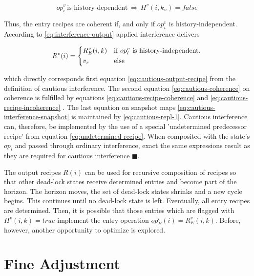 \documentclass[12pt,a4paper]{scrartcl}
\begin{document}
\begin{equation} \label{eq:cautious-recipe-incoherence}
    op^v_i \,\mbox{is history-dependent}\,\Rightarrow\,H^v(i, k_u) = false
\end{equation}

Thus, the entry recipes are coherent if, and only if $op^v_i$ is history-independent.
According to \eqref{eq:interference-output} applied interference delivers

\begin{equation} \label{eq:interference-output-2}
    R^v(i) = \begin{dcases*}
              R_E^v(i,k) & if $op^v_i$ is history-independent.\\
              v_r       & else
             \end{dcases*}
\end{equation}

which directly corresponds first equation \eqref{eq:cautious-output-recipe}
from the definition of cautious interference. The second equation
\eqref{eq:cautious-coherence} on coherence is fulfilled by equations
\eqref{eq:cautious-recipe-coherence} and
\eqref{eq:cautious-recipe-incoherence} . The last equation on snapshot maps
\eqref{eq:cautious-interference-snapshot} is maintained by
\eqref{eq:cautious-repl-1}.  Cautious interference can, therefore, be
implemented by the use of a special 'undetermined predecessor recipe' from
equation \eqref{eq:undetermined-recipe}.  When composited with the state's
$op_i$ and passed through ordinary interference, exact the same expressions
result as they are required for cautious interference $\blacksquare$.

The output recipes $R(i)$ can be used for recursive composition of recipes so
that other dead-lock states receive determined entries and become part of the
horizon.  The horizon moves, the set of dead-lock states shrinks and a new
cycle begins.  This continues until no dead-lock state is left.  Eventually,
all entry recipes are determined. Then, it is possible that those entries which
are flagged with $H^v(i,k)=true$ implement the entry operation
$op_E^v(i)=R_E^v(i,k)$.  Before, however, another opportunity to optimize is
explored. 

%
\section{Fine Adjustment}
\end{document}

